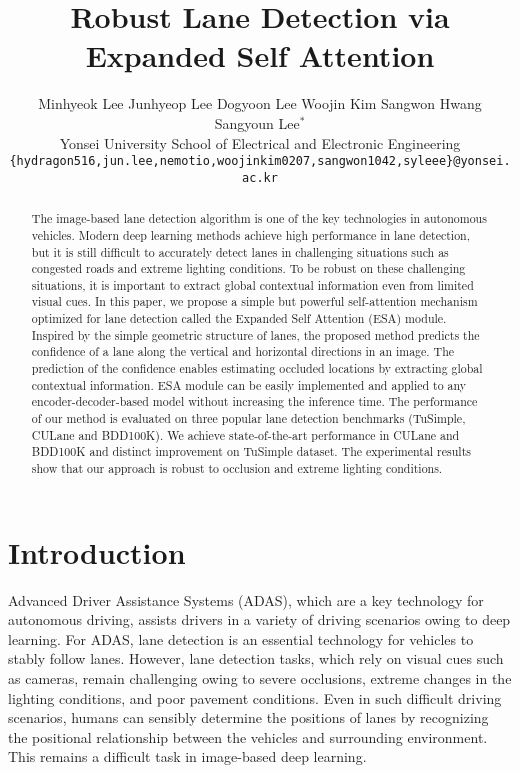 \documentclass[10pt,twocolumn,letterpaper]{article}
\begin{document}
\title{Robust Lane Detection via Expanded Self Attention}

\author{
	Minhyeok Lee \quad
	Junhyeop Lee \quad
	Dogyoon Lee \quad
	Woojin Kim \quad
	Sangwon Hwang \\
	Sangyoun Lee$^{*}$ \quad
\vspace{0.01cm}\\
	Yonsei University School of Electrical and Electronic Engineering \\
	{\tt\small \{hydragon516,jun.lee,nemotio,woojinkim0207,sangwon1042,syleee\}@yonsei.ac.kr}
}

\maketitle

\ifwacvfinal
\thispagestyle{empty}
\fi

\begin{abstract}
   The image-based lane detection algorithm is one of the key technologies in autonomous vehicles. Modern deep learning methods achieve high performance in lane detection, but it is still difficult to accurately detect lanes in challenging situations such as congested roads and extreme lighting conditions. To be robust on these challenging situations, it is important to extract global contextual information even from limited visual cues. In this paper, we propose a simple but powerful self-attention mechanism optimized for lane detection called the Expanded Self Attention (ESA) module. Inspired by the simple geometric structure of lanes, the proposed method predicts the confidence of a lane along the vertical and horizontal directions in an image. The prediction of the confidence enables estimating occluded locations by extracting global contextual information. ESA module can be easily implemented and applied to any encoder-decoder-based model without increasing the inference time. The performance of our method is evaluated on three popular lane detection benchmarks (TuSimple, CULane and BDD100K). We achieve state-of-the-art performance in CULane and BDD100K and distinct improvement on TuSimple dataset. The experimental results show that our approach is robust to occlusion and extreme lighting conditions. 
\end{abstract}

\section{Introduction}
Advanced Driver Assistance Systems (ADAS), which are a key technology for autonomous driving, assists drivers in a variety of driving scenarios owing to deep learning. For ADAS, lane detection is an essential technology for vehicles to stably follow lanes. However, lane detection tasks, which rely on visual cues such as cameras, remain challenging owing to severe occlusions, extreme changes in the lighting conditions, and poor pavement conditions. Even in such difficult driving scenarios, humans can sensibly determine the positions of lanes by recognizing the positional relationship between the vehicles and surrounding environment. This remains a difficult task in image-based deep learning.
\end{document}

